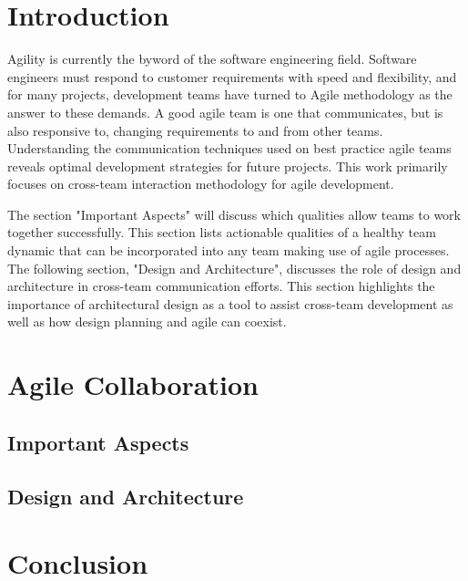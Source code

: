 \documentclass[sigplan,screen]{acmart}
\begin{document}
%
\maketitle

\section{Introduction}
Agility is currently the byword of the software engineering field.
Software engineers must respond to customer requirements with speed and flexibility, and for many projects, development teams have turned to Agile methodology as the answer to these demands.
A good agile team is one that communicates, but is also responsive to, changing requirements to and from other teams.
Understanding the communication techniques used on best practice agile teams reveals optimal development strategies for future projects.
This work primarily focuses on cross-team interaction methodology for agile development.


The section "Important Aspects" will discuss which qualities allow teams to work together successfully.
This section lists actionable qualities of a healthy team dynamic that can be incorporated into any team making use of agile processes.
The following section, "Design and Architecture", discusses the role of design and architecture in cross-team communication efforts.
This section highlights the importance of architectural design as a tool to assist cross-team development as well as how design planning and agile can coexist. 
\section{Agile Collaboration}

\subsection{Important Aspects}

\subsection{Design and Architecture}

\section{Conclusion}


%


\end{document}
